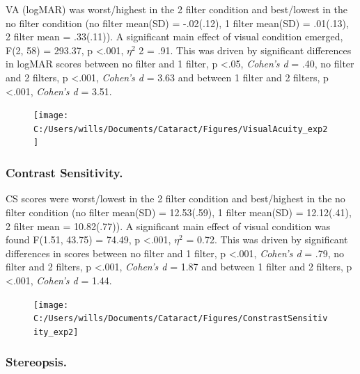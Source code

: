 \documentclass[
  english,
  man,floatsintext]{apa6}
\begin{document}
VA (logMAR) was worst/highest in the 2 filter condition and best/lowest in the no filter condition (no filter mean(SD) = -.02(.12), 1 filter mean(SD) = .01(.13), 2 filter mean = .33(.11)).
A significant main effect of visual condition emerged, F(2, 58) = 293.37, p \textless{}.001, \(\eta^2\) 2 = .91.
This was driven by significant differences in logMAR scores between no filter and 1 filter, p \textless{}.05, \emph{Cohen's d} = .40, no filter and 2 filters, p \textless{}.001, \emph{Cohen's d} = 3.63 and between 1 filter and 2 filters, p \textless{}.001, \emph{Cohen's d} = 3.51.

\begin{figure}

{\centering \texttt{[image: C:/Users/wills/Documents/Cataract/Figures/VisualAcuity\_exp2]} 

}

\caption{ }\label{fig:unnamed-chunk-5}
\end{figure}

\hypertarget{contrast-sensitivity.}{%
\subsubsection{Contrast Sensitivity.}\label{contrast-sensitivity.}}

CS scores were worst/lowest in the 2 filter condition and best/highest in the no filter condition (no filter mean(SD) = 12.53(.59), 1 filter mean(SD) = 12.12(.41), 2 filter mean = 10.82(.77)).
A significant main effect of visual condition was found F(1.51, 43.75) = 74.49, p \textless{}.001, \(\eta^2\) = 0.72.
This was driven by significant differences in scores between no filter and 1 filter, p \textless{}.001, \emph{Cohen's d} = .79, no filter and 2 filters, p \textless{}.001, \emph{Cohen's d} = 1.87 and between 1 filter and 2 filters, p \textless{}.001, \emph{Cohen's d} = 1.44.

\begin{figure}

{\centering \texttt{[image: C:/Users/wills/Documents/Cataract/Figures/ConstrastSensitivity\_exp2]} 

}

\caption{ }\label{fig:unnamed-chunk-6}
\end{figure}

\hypertarget{stereopsis.}{%
\subsubsection{Stereopsis.}\label{stereopsis.}}
\end{document}
